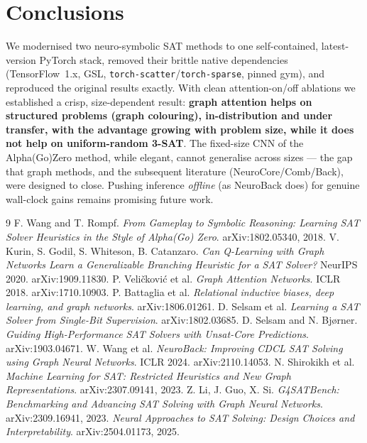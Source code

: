 \documentclass[11pt]{article}
\begin{document}
\section{Conclusions}
We modernised two neuro-symbolic SAT methods to one self-contained, latest-version
PyTorch stack, removed their brittle native dependencies (TensorFlow~1.x, GSL,
\texttt{torch-scatter}/\texttt{torch-sparse}, pinned gym), and reproduced the
original results exactly. With clean attention-on/off ablations we established a
crisp, size-dependent result: \textbf{graph attention helps on structured problems
(graph colouring), in-distribution and under transfer, with the advantage growing
with problem size, while it does not help on uniform-random 3-SAT}. The fixed-size
CNN of the Alpha(Go)Zero method, while elegant, cannot generalise across sizes ---
the gap that graph methods, and the subsequent literature (NeuroCore/Comb/Back),
were designed to close. Pushing inference \emph{offline} (as NeuroBack does) for
genuine wall-clock gains remains promising future work.

\begin{thebibliography}{9}
 F. Wang and T. Rompf. \emph{From Gameplay to Symbolic Reasoning:
  Learning SAT Solver Heuristics in the Style of Alpha(Go) Zero}. arXiv:1802.05340, 2018.
 V. Kurin, S. Godil, S. Whiteson, B. Catanzaro. \emph{Can
  Q-Learning with Graph Networks Learn a Generalizable Branching Heuristic for a
  SAT Solver?} NeurIPS 2020. arXiv:1909.11830.
 P. Veli\v{c}kovi\'c et al. \emph{Graph Attention
  Networks}. ICLR 2018. arXiv:1710.10903.
 P. Battaglia et al. \emph{Relational inductive biases, deep
  learning, and graph networks}. arXiv:1806.01261.
 D. Selsam et al. \emph{Learning a SAT Solver from Single-Bit
  Supervision}. arXiv:1802.03685.
 D. Selsam and N. Bj{\o}rner. \emph{Guiding High-Performance SAT
  Solvers with Unsat-Core Predictions}. arXiv:1903.04671.
 W. Wang et al. \emph{NeuroBack: Improving CDCL SAT Solving using
  Graph Neural Networks}. ICLR 2024. arXiv:2110.14053.
 N. Shirokikh et al. \emph{Machine Learning for SAT: Restricted
  Heuristics and New Graph Representations}. arXiv:2307.09141, 2023.
 Z. Li, J. Guo, X. Si. \emph{G4SATBench: Benchmarking and
  Advancing SAT Solving with Graph Neural Networks}. arXiv:2309.16941, 2023.
 \emph{Neural Approaches to SAT Solving: Design Choices and
  Interpretability}. arXiv:2504.01173, 2025.
\end{thebibliography}
\end{document}
